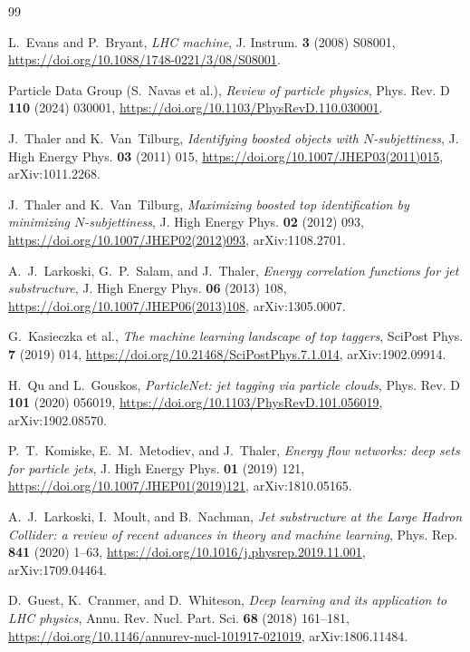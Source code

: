 \documentclass[pdflatex,sn-mathphys,Numbered,iicol]{sn-jnl}
\begin{document}
\begin{thebibliography}{99}

L.~Evans and P.~Bryant,
\emph{LHC machine},
J. Instrum. \textbf{3} (2008) S08001,
\url{https://doi.org/10.1088/1748-0221/3/08/S08001}.

Particle Data Group (S.~Navas et al.),
\emph{Review of particle physics},
Phys. Rev. D \textbf{110} (2024) 030001,
\url{https://doi.org/10.1103/PhysRevD.110.030001}.

J.~Thaler and K.~Van~Tilburg,
\emph{Identifying boosted objects with $N$-subjettiness},
J. High Energy Phys. \textbf{03} (2011) 015,
\url{https://doi.org/10.1007/JHEP03(2011)015},
arXiv:1011.2268.

J.~Thaler and K.~Van~Tilburg,
\emph{Maximizing boosted top identification by minimizing $N$-subjettiness},
J. High Energy Phys. \textbf{02} (2012) 093,
\url{https://doi.org/10.1007/JHEP02(2012)093},
arXiv:1108.2701.

A.~J.~Larkoski, G.~P.~Salam, and J.~Thaler,
\emph{Energy correlation functions for jet substructure},
J. High Energy Phys. \textbf{06} (2013) 108,
\url{https://doi.org/10.1007/JHEP06(2013)108},
arXiv:1305.0007.

G.~Kasieczka et al.,
\emph{The machine learning landscape of top taggers},
SciPost Phys. \textbf{7} (2019) 014,
\url{https://doi.org/10.21468/SciPostPhys.7.1.014},
arXiv:1902.09914.

H.~Qu and L.~Gouskos,
\emph{ParticleNet: jet tagging via particle clouds},
Phys. Rev. D \textbf{101} (2020) 056019,
\url{https://doi.org/10.1103/PhysRevD.101.056019},
arXiv:1902.08570.

P.~T.~Komiske, E.~M.~Metodiev, and J.~Thaler,
\emph{Energy flow networks: deep sets for particle jets},
J. High Energy Phys. \textbf{01} (2019) 121,
\url{https://doi.org/10.1007/JHEP01(2019)121},
arXiv:1810.05165.

A.~J.~Larkoski, I.~Moult, and B.~Nachman,
\emph{Jet substructure at the Large Hadron Collider: a review of recent advances in
theory and machine learning},
Phys. Rep. \textbf{841} (2020) 1--63,
\url{https://doi.org/10.1016/j.physrep.2019.11.001},
arXiv:1709.04464.

D.~Guest, K.~Cranmer, and D.~Whiteson,
\emph{Deep learning and its application to LHC physics},
Annu. Rev. Nucl. Part. Sci. \textbf{68} (2018) 161--181,
\url{https://doi.org/10.1146/annurev-nucl-101917-021019},
arXiv:1806.11484.


\end{thebibliography}
\end{document}
